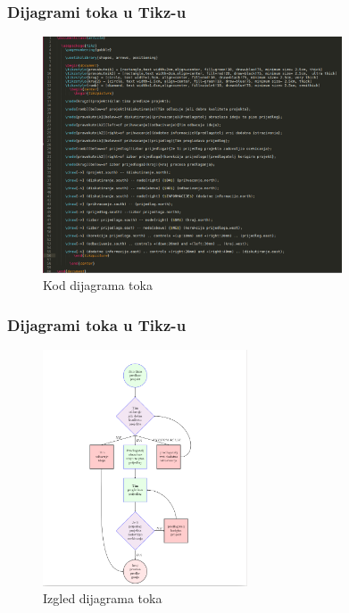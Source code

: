 \documentclass{beamer}
\begin{document}
	\begin{frame}
	\frametitle{Dijagrami toka u Tikz-u}
		\begin{figure}
			\begin{center}
				\includegraphics[width=12 cm,height=7cm]{Slike/kod.png}
				\caption{Kod dijagrama toka}
			\end{center}
		\end{figure}
	\end{frame}

	\begin{frame}
	\frametitle{Dijagrami toka u Tikz-u}
		\begin{figure}
			\begin{center}
				\includegraphics[width=9 cm,height=7cm]{Slike/izgled.png}
				\caption{Izgled dijagrama toka}
			\end{center}
		\end{figure}
	\end{frame}
\end{document}
